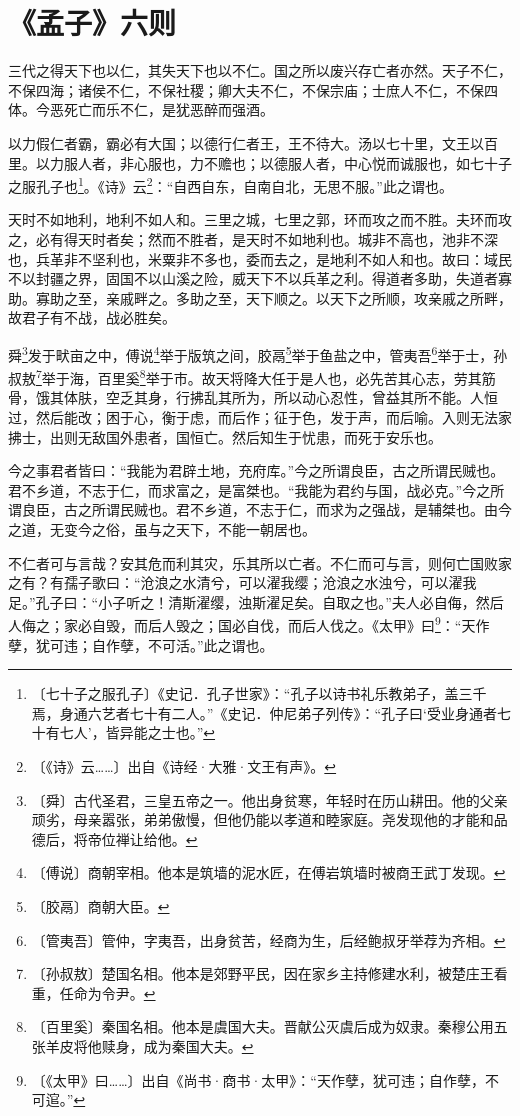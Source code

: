 \documentclass[12pt,UTF-8,openany]{ctexbook}
\begin{document}
\chapter{《孟子》六则}

\begin{normalsize}
    
    三代之得天下也以仁，其失天下也以不仁。国之所以废兴存亡者亦然。天子不仁，不保四海；诸侯不仁，不保社稷；卿大夫不仁，不保宗庙；士庶人不仁，不保四体。今恶死亡而乐不仁，是犹恶醉而强酒。
    
    以力假仁者霸，霸必有大国；以德行仁者王，王不待大。汤以七十里，文王以百里。以力服人者，非心服也，力不赡也；以德服人者，中心悦而诚服也，如七十子之服孔子也\footnote{〔七十子之服孔子〕《史记．孔子世家》：“孔子以诗书礼乐教弟子，盖三千焉，身通六艺者七十有二人。”《史记．仲尼弟子列传》：“孔子曰‘受业身通者七十有七人’，皆异能之士也。”}。《诗》云\footnote{〔《诗》云……〕出自《诗经·大雅·文王有声》。}：“自西自东，自南自北，无思不服。”此之谓也。
    
    天时不如地利，地利不如人和。三里之城，七里之郭，环而攻之而不胜。夫环而攻之，必有得天时者矣；然而不胜者，是天时不如地利也。城非不高也，池非不深也，兵革非不坚利也，米粟非不多也，委而去之，是地利不如人和也。故曰：域民不以封疆之界，固国不以山溪之险，威天下不以兵革之利。得道者多助，失道者寡助。寡助之至，亲戚畔之。多助之至，天下顺之。以天下之所顺，攻亲戚之所畔，故君子有不战，战必胜矣。
    
    舜\footnote{〔舜〕古代圣君，三皇五帝之一。他出身贫寒，年轻时在历山耕田。他的父亲顽劣，母亲嚣张，弟弟傲慢，但他仍能以孝道和睦家庭。尧发现他的才能和品德后，将帝位禅让给他。}发于畎亩之中，傅说\footnote{〔傅说〕商朝宰相。他本是筑墙的泥水匠，在傅岩筑墙时被商王武丁发现。}举于版筑之间，胶鬲\footnote{〔胶鬲〕商朝大臣。}举于鱼盐之中，管夷吾\footnote{〔管夷吾〕管仲，字夷吾，出身贫苦，经商为生，后经鲍叔牙举荐为齐相。}举于士，孙叔敖\footnote{〔孙叔敖〕楚国名相。他本是郊野平民，因在家乡主持修建水利，被楚庄王看重，任命为令尹。}举于海，百里奚\footnote{〔百里奚〕秦国名相。他本是虞国大夫。晋献公灭虞后成为奴隶。秦穆公用五张羊皮将他赎身，成为秦国大夫。}举于市。故天将降大任于是人也，必先苦其心志，劳其筋骨，饿其体肤，空乏其身，行拂乱其所为，所以动心忍性，曾益其所不能。人恒过，然后能改；困于心，衡于虑，而后作；征于色，发于声，而后喻。入则无法家拂士，出则无敌国外患者，国恒亡。然后知生于忧患，而死于安乐也。
    
    今之事君者皆曰：“我能为君辟土地，充府库。”今之所谓良臣，古之所谓民贼也。君不乡道，不志于仁，而求富之，是富桀也。“我能为君约与国，战必克。”今之所谓良臣，古之所谓民贼也。君不乡道，不志于仁，而求为之强战，是辅桀也。由今之道，无变今之俗，虽与之天下，不能一朝居也。
    
    不仁者可与言哉？安其危而利其灾，乐其所以亡者。不仁而可与言，则何亡国败家之有？有孺子歌曰：“沧浪之水清兮，可以濯我缨；沧浪之水浊兮，可以濯我足。”孔子曰：“小子听之！清斯濯缨，浊斯濯足矣。自取之也。”夫人必自侮，然后人侮之；家必自毁，而后人毁之；国必自伐，而后人伐之。《太甲》曰\footnote{〔《太甲》曰……〕出自《尚书·商书·太甲》：“天作孽，犹可违；自作孽，不可逭。”}：“天作孽，犹可违；自作孽，不可活。”此之谓也。
\end{normalsize}
\end{document}
